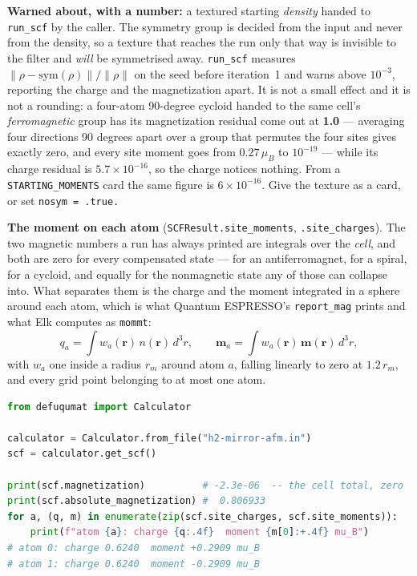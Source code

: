 \documentclass[11pt,a4paper]{article}
\newcommand{\qe}{Quantum ESPRESSO}
\newcommand{\code}[1]{\texttt{\small #1}}
\begin{document}
\begin{refuses}
\textbf{Warned about, with a number:} a textured starting \emph{density} handed
to \code{run\_scf} by the caller. The symmetry group is decided from the input
and never from the density, so a texture that reaches the run only that way is
invisible to the filter and \emph{will} be symmetrised away. \code{run\_scf}
measures $\lVert \rho - \mathrm{sym}(\rho)\rVert / \lVert \rho\rVert$ on the seed
before iteration~1 and warns above $10^{-3}$, reporting the charge and the
magnetization apart. It is not a small effect and it is not a rounding: a
four-atom 90-degree cycloid handed to the same cell's \emph{ferromagnetic} group
has its magnetization residual come out at \textbf{1.0} --- averaging four
directions 90 degrees apart over a group that permutes the four sites gives
exactly zero, and every site moment goes from $0.27\,\mu_B$ to $10^{-19}$ ---
while its charge residual is $5.7\times10^{-16}$, so the charge notices nothing.
From a \code{STARTING\_MOMENTS} card the same figure is $6\times10^{-16}$. Give
the texture as a card, or set \code{nosym = .true.}
\end{refuses}

\textbf{The moment on each atom} (\code{SCFResult.site\_moments},
\code{.site\_charges}). The two magnetic numbers a run has always printed are
integrals over the \emph{cell}, and both are zero for every compensated state
--- for an antiferromagnet, for a spiral, for a cycloid, and equally for the
nonmagnetic state any of those can collapse into. What separates them is the
charge and the moment integrated in a sphere around each atom, which is what
\qe{}'s \code{report\_mag} prints and what Elk computes as \code{mommt}:
%
\[
  q_a = \int w_a(\mathbf{r})\, n(\mathbf{r})\, d^3r,
  \qquad
  \mathbf{m}_a = \int w_a(\mathbf{r})\, \mathbf{m}(\mathbf{r})\, d^3r,
\]
%
with $w_a$ one inside a radius $r_m$ around atom $a$, falling linearly to zero
at $1.2\,r_m$, and every grid point belonging to at most one atom.

\begin{lstlisting}[language=Python]
from defuqumat import Calculator

calculator = Calculator.from_file("h2-mirror-afm.in")
scf = calculator.get_scf()

print(scf.magnetization)          # -2.3e-06  -- the cell total, zero
print(scf.absolute_magnetization) #  0.806933
for a, (q, m) in enumerate(zip(scf.site_charges, scf.site_moments)):
    print(f"atom {a}: charge {q:.4f}  moment {m[0]:+.4f} mu_B")
# atom 0: charge 0.6240  moment +0.2909 mu_B
# atom 1: charge 0.6240  moment -0.2909 mu_B
\end{lstlisting}
\end{document}
